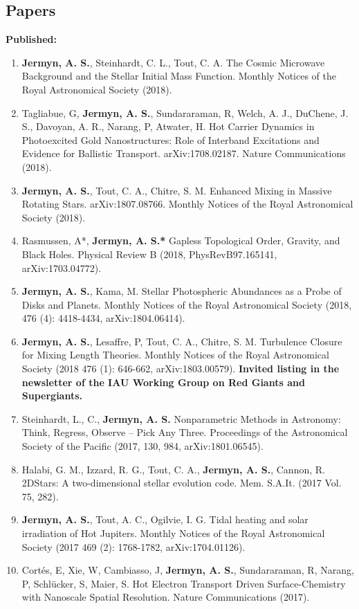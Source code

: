 \documentclass[line, margin]{res3address}
\begin{document}
\begin{resume}
\section{Papers}
\textbf{Published:}
\begin{enumerate}[leftmargin=10pt]
\item \textbf{Jermyn, A. S.}, Steinhardt, C. L., Tout, C. A. The Cosmic Microwave Background and the Stellar Initial Mass Function. Monthly Notices of the Royal Astronomical Society (2018).
\item Tagliabue, G, \textbf{Jermyn, A. S.}, Sundararaman, R, Welch, A. J., DuChene, J. S., Davoyan, A. R., Narang, P, Atwater, H. Hot Carrier Dynamics in Photoexcited Gold Nanostructures: Role of Interband Excitations and Evidence for Ballistic Transport. arXiv:1708.02187. Nature Communications (2018).
\item \textbf{Jermyn, A. S.}, Tout, C. A., Chitre, S. M. Enhanced Mixing in Massive Rotating Stars. arXiv:1807.08766. Monthly Notices of the Royal Astronomical Society (2018).
\item Rasmussen, A*, \textbf{Jermyn, A. S.*} Gapless Topological Order, Gravity, and Black Holes. Physical Review B (2018, PhysRevB97.165141, arXiv:1703.04772).
\item \textbf{Jermyn, A. S.}, Kama, M. Stellar Photospheric Abundances as a Probe of Disks and Planets. Monthly Notices of the Royal Astronomical Society (2018, 476 (4): 4418-4434, arXiv:1804.06414).
\item \textbf{Jermyn, A. S.}, Lesaffre, P, Tout, C. A., Chitre, S. M. Turbulence Closure for Mixing Length Theories. Monthly Notices of the Royal Astronomical Society (2018 476 (1): 646-662, arXiv:1803.00579). \textbf{Invited listing in the newsletter of the IAU Working Group on Red Giants and Supergiants.}
\item Steinhardt, L., C., \textbf{Jermyn, A. S.} Nonparametric Methods in Astronomy: Think, Regress, Observe -- Pick Any Three. Proceedings of the Astronomical Society of the Pacific (2017, 130, 984, arXiv:1801.06545).
\item Halabi, G. M., Izzard, R. G., Tout, C. A., \textbf{Jermyn, A. S.}, Cannon, R. 2DStars: A two-dimensional stellar evolution code. Mem. S.A.It. (2017 Vol. 75, 282).
\item \textbf{Jermyn, A. S.}, Tout, A. C., Ogilvie, I. G. Tidal heating and solar irradiation of Hot Jupiters. Monthly Notices of the Royal Astronomical Society (2017 469 (2): 1768-1782, arXiv:1704.01126).
\item Cortés, E, Xie, W, Cambiasso, J, \textbf{Jermyn, A. S.}, Sundararaman, R, Narang, P, Schl\"{u}cker, S, Maier, S. Hot Electron Transport Driven Surface-Chemistry with Nanoscale Spatial Resolution. Nature Communications (2017).

\end{enumerate}
\end{resume}
\end{document}
